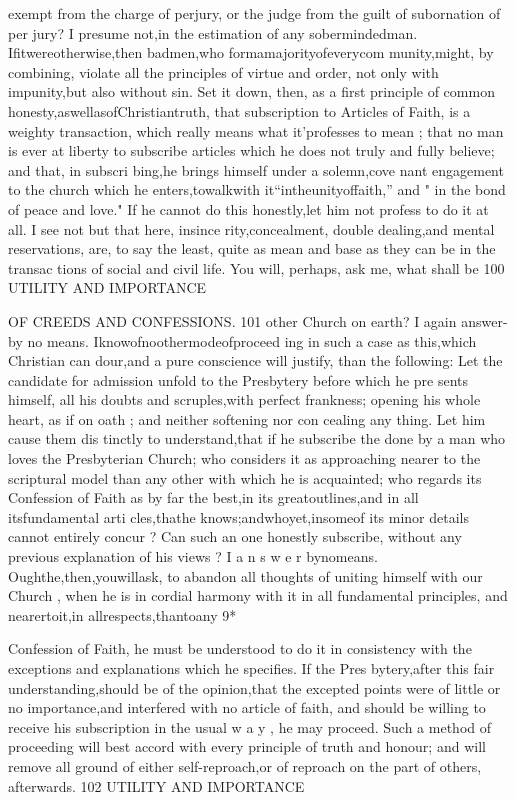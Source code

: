 \documentclass[
]{book}
\begin{document}
exempt from the charge of perjury, or the
judge from the guilt of subornation of per
jury? I presume not,in the estimation of any sobermindedman. Ifitwereotherwise,then
badmen,who formamajorityofeverycom munity,might, by combining, violate all the
principles of virtue and order, not only with impunity,but also without sin.
Set it down, then, as a first principle of common honesty,aswellasofChristiantruth,
that subscription to Articles of Faith, is a
weighty transaction, which really means what
it'professes to mean ; that no man is ever at
liberty to subscribe articles which he does not
truly and fully believe; and that, in subscri
bing,he brings himself under a solemn,cove nant engagement to the church which he
enters,towalkwith it``intheunityoffaith,''
and " in the bond of peace and love." If he cannot do this honestly,let him not profess to do it at all. I see not but that here, insince rity,concealment, double dealing,and mental reservations, are, to say the least, quite as mean and base as they can be in the transac tions of social and civil life.
You will, perhaps, ask me, what shall be
100 UTILITY AND IMPORTANCE

OF CREEDS AND CONFESSIONS. 101
other Church on earth? I again answer- by no means. Iknowofnoothermodeofproceed
ing in such a case as this,which Christian can dour,and a pure conscience will justify, than the following: Let the candidate for admission
unfold to the Presbytery before which he pre sents himself, all his doubts and scruples,with perfect frankness; opening his whole heart, as if on oath ; and neither softening nor con cealing any thing. Let him cause them dis tinctly to understand,that if he subscribe the
done by a man who loves the Presbyterian Church; who considers it as approaching
nearer to the scriptural model than any other with which he is acquainted; who regards its
Confession of Faith as by far the best,in its greatoutlines,and in all itsfundamental arti cles,thathe knows;andwhoyet,insomeof its minor details cannot entirely concur ? Can such an one honestly subscribe, without any previous explanation of his views ? I a n s w e r bynomeans. Oughthe,then,youwillask,
to abandon all thoughts of uniting himself with our Church , when he is in cordial harmony with it in all fundamental principles, and
nearertoit,in allrespects,thantoany
9*

Confession of Faith, he must be understood to do it in consistency with the exceptions and explanations which he specifies. If the Pres bytery,after this fair understanding,should be of the opinion,that the excepted points were of little or no importance,and interfered with no article of faith, and should be willing to receive his subscription in the usual w a y , he
may proceed. Such a method of proceeding will best accord with every principle of truth and honour; and will remove all ground of either self-reproach,or of reproach on the part
of others, afterwards.
102 UTILITY AND IMPORTANCE
\end{document}
